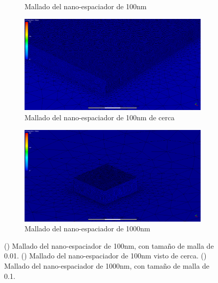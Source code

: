 \begin{enumerate}
\begin{figure}[H]
\begin{subfigure}[b]{0.3\textwidth}
		\caption{Mallado del nano-espaciador de 100nm}
		\label{fig:mallado_100_metodos}
	\end{subfigure}
	\hfill
	\begin{subfigure}[b]{0.3\textwidth}
		\centering
			\includegraphics[width=1.00\textwidth]{figuras/Procedimiento_Simulaciones/Conduccion/mallado_100_cerca.png}
		\caption{Mallado del nano-espaciador de 100nm de cerca}
		\label{fig:mallado_100_cerca_metodos}
	\end{subfigure}
	\hfill
	\begin{subfigure}[b]{0.3\textwidth}
		\centering
			\includegraphics[width=1.00\textwidth]{figuras/Procedimiento_Simulaciones/Conduccion/mallado_1000.png}
		\caption{Mallado del nano-espaciador de 1000nm}
		\label{fig:mallado_1000_cerca_metodos}
	\end{subfigure}
	\caption{() Mallado del nano-espaciador de 100nm, con tamaño de malla de 0.01. () Mallado del nano-espaciador de 100nm visto de cerca. () Mallado del nano-espaciador de 1000nm, con tamaño de malla de 0.1.}
	\label{fig:mallados_metodos}
\end{figure} 

\end{enumerate}
